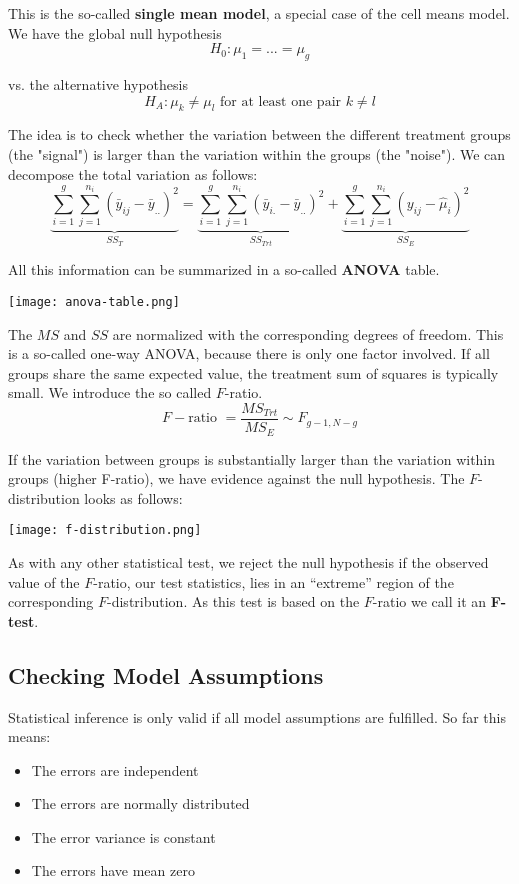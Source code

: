 This is the so-called \textbf{single mean model}, a special case of the cell means model. We have the global null hypothesis
$$H_0 : \mu_1 = ... = \mu_g$$

vs. the alternative hypothesis
$$H_A : \mu_k \neq \mu_l \text{ for at least one pair } k \neq l$$

The idea is to check whether the variation between the different treatment groups (the "signal") is  larger than the variation within the groups (the "noise"). We can decompose the total variation as follows:
$$\underbrace{\sum_{i=1}^g \sum_{j=1}^{n_i}(\bar y_{ij} - \bar y_{..})^2}_{SS_T} = \underbrace{\sum_{i=1}^g \sum_{j=1}^{n_i}(\bar y_{i.} - \bar y_{..})^2}_{SS_{Trt}} + \underbrace{\sum_{i=1}^g \sum_{j=1}^{n_i}(y_{ij} - \hat \mu_i)^2}_{SS_E} $$

All this information can be summarized in a so-called \textbf{ANOVA} table.
\begin{center}
	\texttt{[image: anova-table.png]}
\end{center}

The $MS$ and $SS$ are normalized with the corresponding degrees of freedom. This is a so-called one-way ANOVA, because there is only one factor involved. If all groups share the same expected value, the treatment sum of squares is typically small. We introduce the so called $F$-ratio.
$$F-\text{ratio } = \frac{MS_{Trt}}{MS_E} \sim F_{g-1, N-g}$$

If the variation between groups is substantially larger than the variation within groups (higher F-ratio), we have evidence against the null hypothesis. The $F$-distribution looks as follows:
\begin{center}
	\texttt{[image: f-distribution.png]}
\end{center}

As with any other statistical test, we reject the null hypothesis if the observed value of the $F$-ratio, our test statistics, lies in an “extreme” region of the corresponding $F$-distribution. As this test is based on the $F$-ratio we call it an \textbf{F-test}.


\subsection{Checking Model Assumptions}

Statistical inference is only valid if all model assumptions are fulfilled. So far this means:
\begin{itemize}
	\item The errors are independent
	\item The errors are normally distributed
	\item The error variance is constant
	\item The errors have mean zero
\end{itemize}

